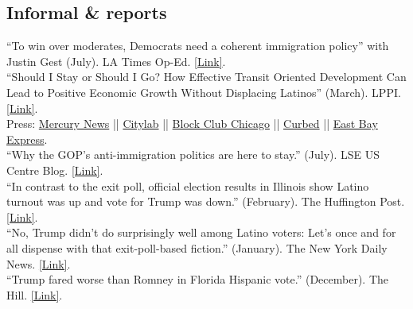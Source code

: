 \documentclass[11pt, a4paper]{article}
\newcommand{\years}[1]{\marginnote{\scriptsize #1}}
\begin{document}
\subsection*{Informal \& reports}
\years{2018} ``To win over moderates, Democrats need a coherent immigration policy'' with Justin Gest (July). LA Times Op-Ed. \href{http://www.latimes.com/opinion/op-ed/la-oe-gest-reny-immigration-policy-democrats-20180720-story.html}{[Link]}.\\
\years{} ``Should I Stay or Should I Go? How Effective Transit Oriented Development Can Lead to Positive Economic Growth Without Displacing Latinos'' (March). LPPI. \href{http://latino.ucla.edu/}{[Link]}.\\
\indent Press: 
\indent \href{https://www.mercurynews.com/2018/03/29/development-without-gentrification-oaklands-fruitvale-is-the-model-report-says/}{Mercury News} || 
\indent \href{https://www.citylab.com/equity/2018/04/how-transit-oriented-development-can-prevent-displacement/556373/?utm_source=twb%3Futm_source%3Dfbb}{Citylab} || \indent \href{https://blockclubchicago.org/2018/11/12/can-chicagos-gentrifying-neighborhoods-grow-without-leaving-longtime-residents-behind-oaklands-fruitvale-village-offers-hope/}{Block Club Chicago} ||
\indent \href{https://sf.curbed.com/2018/4/4/17198326/oakland-fruitvale-transit-village-housing-displacement-gentrification}{Curbed} || 
\indent \href{https://www.eastbayexpress.com/SevenDays/archives/2018/04/02/mondays-briefing-ucla-study-says-fruitvale-village-is-a-model-for-urban-planning-stephon-clark-protestor-struck-by-sacramento-sheriffs-veh}{East Bay Express}.\\
\years{} ``Why the GOP’s anti-immigration politics are here to stay.'' (July). LSE US Centre Blog. \href{http://blogs.lse.ac.uk/usappblog/2018/07/09/why-the-gops-anti-immigration-politics-are-here-to-stay/}{[Link]}.\\
\years{2017} ``In contrast to the exit poll, official election results in Illinois show Latino turnout was up and vote for Trump was down.'' (February). The Huffington Post. \href{http://huff.to/2lC9rc8}{[Link]}.\\
\years{} ``No, Trump didn't do surprisingly well among Latino voters: Let's once and for all dispense with that exit-poll-based fiction.'' (January). The New York Daily News. \href{http://nydn.us/2jtowIr}{[Link]}.\\
\years{2016} ``Trump fared worse than Romney in Florida Hispanic vote.'' (December). The Hill. \href{http://bit.ly/2gNFKOz}{[Link]}.\\
\end{document}
